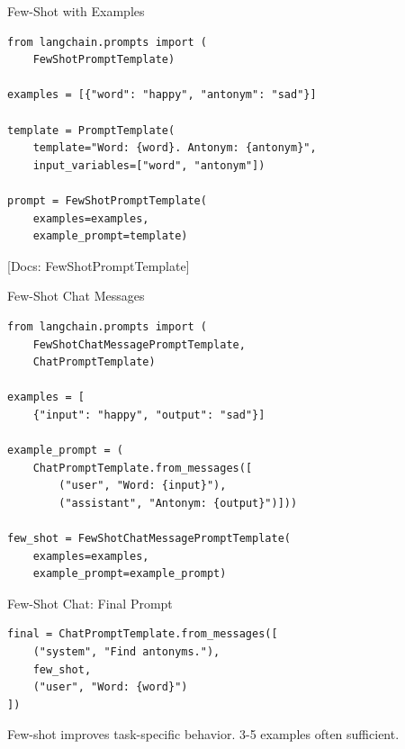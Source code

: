 \documentclass[aspectratio=169,11pt]{beamer}
\newcommand{\docref}[1]{{\scriptsize\color{docgray}[Docs: #1]}}
\begin{document}
\begin{frame}[fragile]{Few-Shot with Examples}
  \begin{codebox}
    \begin{lstlisting}[basicstyle=\ttfamily\tiny]
from langchain.prompts import (
    FewShotPromptTemplate)

examples = [{"word": "happy", "antonym": "sad"}]

template = PromptTemplate(
    template="Word: {word}. Antonym: {antonym}",
    input_variables=["word", "antonym"])

prompt = FewShotPromptTemplate(
    examples=examples,
    example_prompt=template)
    \end{lstlisting}
  \end{codebox}

  \docref{FewShotPromptTemplate}
\end{frame}

\begin{frame}[fragile]{Few-Shot Chat Messages}
  \begin{codebox}
    \begin{lstlisting}
from langchain.prompts import (
    FewShotChatMessagePromptTemplate,
    ChatPromptTemplate)

examples = [
    {"input": "happy", "output": "sad"}]

example_prompt = (
    ChatPromptTemplate.from_messages([
        ("user", "Word: {input}"),
        ("assistant", "Antonym: {output}")]))

few_shot = FewShotChatMessagePromptTemplate(
    examples=examples,
    example_prompt=example_prompt)
    \end{lstlisting}
  \end{codebox}
\end{frame}

\begin{frame}[fragile]{Few-Shot Chat: Final Prompt}
  \begin{codebox}
    \begin{lstlisting}
final = ChatPromptTemplate.from_messages([
    ("system", "Find antonyms."),
    few_shot,
    ("user", "Word: {word}")
])
    \end{lstlisting}
  \end{codebox}

  \begin{tipbox}
    Few-shot improves task-specific behavior. 3-5 examples often sufficient.
  \end{tipbox}
\end{frame}
\end{document}
